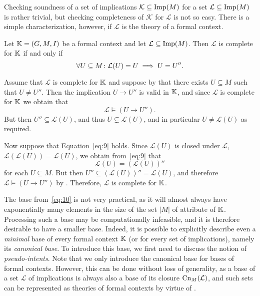 Checking soundness of a set of implications $\mathcal{K} \subseteq \operatorname{Imp}(M)$ for a set
$\mathcal{L} \subseteq \operatorname{Imp}(M)$ is rather trivial, but checking completeness of
$\mathcal{K}$ for $\mathcal{L}$ is not so easy.  There is a
simple characterization, however, if $\mathcal{L}$ is the theory of a formal context.

\begin{Lemma}
  \label{lem:characterization-of-completeness}
  Let ${\mathbb{K}} = (G, M, I)$ be a formal context and let $\mathcal{L} \subseteq \operatorname{Imp}(M)$.
  Then $\mathcal{L}$ is complete for ${\mathbb{K}}$ if and only if
  \begin{equation}
    \label{eq:9}
    \forall U \subseteq M \colon \mathcal{L}(U) = U \implies U = U''.
  \end{equation}
\end{Lemma}
\begin{Proof}
  Assume that $\mathcal{L}$ is complete for ${\mathbb{K}}$ and suppose by that there exists $U
  \subseteq M$ such that $U \neq U''$.  Then the implication $U \to U''$ is valid in ${\mathbb{K}}$, and since $\mathcal{L}$ is complete for ${\mathbb{K}}$ we obtain that
  \begin{equation*}
    \mathcal{L} \models (U \to U'').
  \end{equation*}
  But then $U'' \subseteq \mathcal{L}(U)$, and thus $U \subsetneq \mathcal{L}(U)$, and in
  particular $U \neq \mathcal{L}(U)$ as required.

  Now suppose that Equation~\eqref{eq:9} holds.  Since $\mathcal{L}(U)$ is closed under
  $\mathcal{L}$, \ie $\mathcal{L}(\mathcal{L}(U)) = \mathcal{L}(U)$, we obtain
  from~\eqref{eq:9} that
  \begin{equation*}
    \mathcal{L}(U) = (\mathcal{L}(U))''
  \end{equation*}
  for each $U \subseteq M$.  But then $U'' \subseteq (\mathcal{L}(U))'' = \mathcal{L}(U)$,
  and therefore $\mathcal{L} \models (U \to U'')$ by
  .
  Therefore, $\mathcal{L}$ is complete for ${\mathbb{K}}$.
\end{Proof}

The base from~\eqref{eq:10} is not very practical, as it will almost always have
exponentially many elements in the size of the set $|M|$ of attribute of ${\mathbb{K}}$.
Processing such a base may be computationally infeasible, and it is therefore desirable to
have a smaller base.  Indeed, it is possible to explicitly describe even a \emph{minimal}
base of every formal context ${\mathbb{K}}$ (or for every set of implications), namely its
\emph{canonical base}.  To introduce this base, we first need to discuss the notion of
\emph{pseudo-intents}.  Note that we only introduce the canonical base for bases of formal
contexts.  However, this can be done without loss of generality, as a base of a set
$\mathcal{L}$ of implications is always also a base of its closure $\operatorname{Cn}_M(\mathcal{L})$,
and such sets can be represented as theories of formal contexts by virtue of
.

